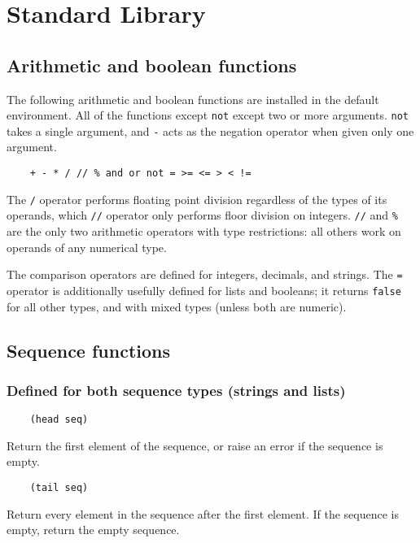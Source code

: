 \documentclass{article}
\newcommand{\inlinecode}{\texttt}
\begin{document}
\section{Standard Library}
\subsection{Arithmetic and boolean functions}
The following arithmetic and boolean functions are installed in the default environment. All of the functions except \inlinecode{not} except two or more arguments. \inlinecode{not} takes a single argument, and \inlinecode{-} acts as the negation operator when given only one argument.

\begin{verbatim}
    + - * / // % and or not = >= <= > < !=
\end{verbatim}

The \inlinecode{/} operator performs floating point division regardless of the types of its operands, which \inlinecode{//} operator only performs floor division on integers. \inlinecode{//} and \inlinecode{\%} are the only two arithmetic operators with type restrictions: all others work on operands of any numerical type.

The comparison operators are defined for integers, decimals, and strings. The \inlinecode{=} operator is additionally usefully defined for lists and booleans; it returns \inlinecode{false} for all other types, and with mixed types (unless both are numeric).

\subsection{Sequence functions}
\subsubsection{Defined for both sequence types (strings and lists)}

\begin{verbatim}
    (head seq)
\end{verbatim}

Return the first element of the sequence, or raise an error if the sequence is empty.

\begin{verbatim}
    (tail seq)
\end{verbatim}

Return every element in the sequence after the first element. If the sequence is empty, return the empty sequence.
\end{document}
